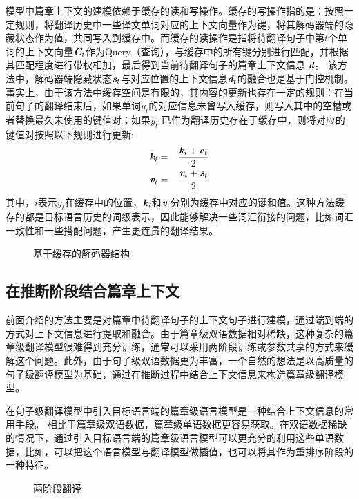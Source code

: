 \parinterval 模型中篇章上下文的建模依赖于缓存的读和写操作。缓存的写操作指的是：按照一定规则，将翻译历史中一些译文单词对应的上下文向量作为键，将其解码器端的隐藏状态作为值，共同写入到缓存中。而缓存的读操作是指将待翻译句子中第$t$个单词的上下文向量$\textbf{\em C}_t$作为Query（查询），与缓存中的所有键分别进行匹配，并根据其匹配程度进行带权相加，最后得到当前待翻译句子的篇章上下文信息 $\textbf{\em d}$。 该方法中，解码器端隐藏状态$\textbf{\em s}_t$与对应位置的上下文信息$\textbf{\em d}_t$的融合也是基于门控机制。事实上，由于该方法中缓存空间是有限的，其内容的更新也存在一定的规则：在当前句子的翻译结束后，如果单词$y_t$的对应信息未曾写入缓存，则写入其中的空槽或者替换最久未使用的键值对；如果$y_t$ 已作为翻译历史存在于缓存中，则将对应的键值对按照以下规则进行更新:
\begin{eqnarray}
\textbf{\em k}_{i}&=&\frac{\textbf{\em k}_{i}+\textbf{\em c}_{t}}{2}
\label{eq:17-3-10}\\
\textbf{\em v}_{i}&=&\frac{\textbf{\em v}_{i}+\textbf{\em s}_{t}}{2}
\label{eq:17-3-11}
\end{eqnarray}
其中，$i$表示$y_t$在缓存中的位置，$\textbf{\em k}_{i}$和$\textbf{\em v}_{i}$分别为缓存中对应的键和值。这种方法缓存的都是目标语言历史的词级表示，因此能够解决一些词汇衔接的问题，比如词汇一致性和一些搭配问题，产生更连贯的翻译结果。
\begin{figure}[htp]
    \centering
	
    \caption{基于缓存的解码器结构}
    \label{fig:17-20}
\end{figure}


\subsection{在推断阶段结合篇章上下文}

\parinterval 前面介绍的方法主要是对篇章中待翻译句子的上下文句子进行建模，通过端到端的方式对上下文信息进行提取和融合。由于篇章级双语数据相对稀缺，这种复杂的篇章级翻译模型很难得到充分训练，通常可以采用两阶段训练或参数共享的方式来缓解这个问题。此外，由于句子级双语数据更为丰富，一个自然的想法是以高质量的句子级翻译模型为基础，通过在推断过程中结合上下文信息来构造篇章级翻译模型。

\parinterval 在句子级翻译模型中引入目标语言端的篇章级语言模型是一种结合上下文信息的常用手段。 相比于篇章级双语数据，篇章级单语数据更容易获取。在双语数据稀缺的情况下，通过引入目标语言端的篇章级语言模型可以更充分的利用这些单语数据，比如，可以把这个语言模型与翻译模型做插值，也可以将其作为重排序阶段的一种特征。
\begin{figure}[htp]
    \centering
	
    \caption{两阶段翻译}
    \label{fig:17-21}
\end{figure}

